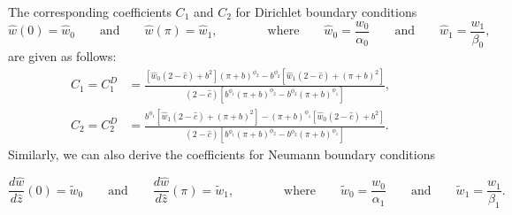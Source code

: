 \documentclass[symmetry,article,accept,moreauthors,pdftex,a4paper]{mdpi}
\begin{document}
\begin{paracol}{2}
\switchcolumn 

The corresponding coefficients $C_1$ and $C_2$ for Dirichlet boundary conditions 
\begin{equation*}
\widehat{w}(0) = \widehat{w}_0 \qquad \text{and} \qquad
\widehat{w}(\pi) = \widehat{w}_1, \qquad \qquad \text{where} \qquad \widehat{w}_0 = \frac{w_0}{\alpha_0} \qquad \text{and} \qquad \widehat{w}_1 = \frac{w_1}{\beta_0},
\end{equation*}
are given as follows:
\begin{align*}
C_1 = C_1^{D} &= \frac{\left[\widehat{w}_0 (2 - \widehat{c}) + b^2 \right](\pi + b)^{\phi_2} - b^{\phi_2} \left[\widehat{w}_1(2 - \widehat{c}) + (\pi + b)^2\right]}{(2 - \widehat{c}) \left[ b^{\phi_1} (\pi + b)^{\phi_2} - b^{\phi_2} (\pi + b)^{\phi_1}\right]}, \\
C_2 = C_2^{D} &= \frac{b^{\phi_1} \left[\widehat{w}_1 (2 - \widehat{c}) + (\pi + b)^2 \right] - (\pi + b)^{\phi_1} \left[\widehat{w}_0(2 - \widehat{c}) + b^2\right]}{(2 - \widehat{c}) \left[ b^{\phi_1} (\pi + b)^{\phi_2} - b^{\phi_2} (\pi + b)^{\phi_1}\right]}.
\end{align*}
Similarly, we can also derive the coefficients for Neumann boundary conditions
\end{paracol}
\begin{equation*}
\frac{d\widehat{w}}{d\widehat{z}}(0) = \widetilde{w}_0 \qquad \text{and} \qquad
\frac{d\widehat{w}}{d\widehat{z}}(\pi) = \widetilde{w}_1, \qquad \qquad \text{where} \qquad \widetilde{w}_0 = \frac{w_0}{\alpha_1} \qquad \text{and} \qquad \widetilde{w}_1 = \frac{w_1}{\beta_1}.
\end{equation*}
\end{document}
